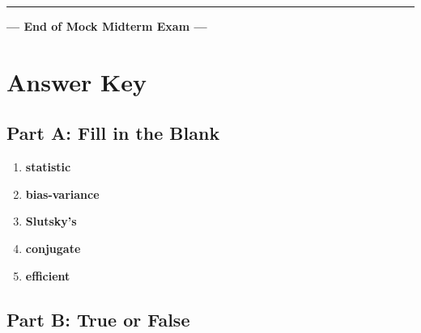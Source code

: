 \documentclass[11pt]{article}
\begin{document}
\bigskip
\hrule
\bigskip
\begin{center}
\textbf{--- End of Mock Midterm Exam ---}
\end{center}

\newpage

\section*{\color{blue!80!black} Answer Key}

\subsection*{Part A: Fill in the Blank}

\begin{enumerate}
\item \textbf{statistic}
\item \textbf{bias-variance}
\item \textbf{Slutsky's}
\item \textbf{conjugate}
\item \textbf{efficient}
\end{enumerate}

\subsection*{Part B: True or False}
\end{document}
